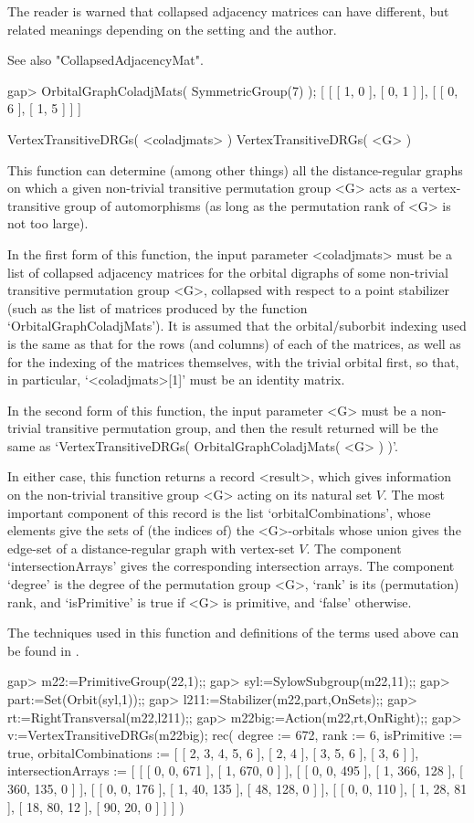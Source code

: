 The reader is warned that collapsed adjacency matrices can have different,
but related meanings depending on the setting and the author.

See also "CollapsedAdjacencyMat".

\beginexample
gap> OrbitalGraphColadjMats( SymmetricGroup(7) );
[ [ [ 1, 0 ], [ 0, 1 ] ], [ [ 0, 6 ], [ 1, 5 ] ] ] 
\endexample


\>VertexTransitiveDRGs( <coladjmats> )
\>VertexTransitiveDRGs( <G> )

This function can determine (among other things) all the distance-regular
graphs on which a given non-trivial transitive permutation group <G>
acts as a vertex-transitive group of automorphisms (as long as the
permutation rank of <G> is not too large).

In the first form of this function, the input parameter <coladjmats> must
be a list of collapsed adjacency matrices for the orbital digraphs of some
non-trivial transitive permutation group <G>, collapsed with respect to a
point stabilizer (such as the list of matrices produced by the function
`OrbitalGraphColadjMats').  It is assumed that the orbital/suborbit
indexing used is the same as that for the rows (and columns) of each of
the matrices, as well as for the indexing of the matrices themselves,
with the trivial orbital first, so that, in particular, `<coladjmats>[1]'
must be an identity matrix.

In the second form of this function, the input parameter <G> must be a
non-trivial transitive permutation group, and then the result returned
will be the same as `VertexTransitiveDRGs( OrbitalGraphColadjMats( <G>
) )'.

In either case, this function returns a record <result>, which gives
information on the non-trivial transitive group <G> acting on its
natural set $V$.  The most important component of this record is the list
`orbitalCombinations', whose elements give the sets of (the indices of)
the <G>-orbitals whose union gives the edge-set of a distance-regular
graph with vertex-set $V$. The component `intersectionArrays' gives
the corresponding intersection arrays. The component `degree' is the
degree of the permutation group <G>, `rank' is its (permutation) rank,
and `isPrimitive' is true if <G> is primitive, and `false' otherwise.

The techniques used in this function and definitions of the terms used
above can be found in \cite{PS97}.

\beginexample
gap> m22:=PrimitiveGroup(22,1);;
gap> syl:=SylowSubgroup(m22,11);;
gap> part:=Set(Orbit(syl,1));;
gap> l211:=Stabilizer(m22,part,OnSets);;
gap> rt:=RightTransversal(m22,l211);;
gap> m22big:=Action(m22,rt,OnRight);;
gap> v:=VertexTransitiveDRGs(m22big);
rec( degree := 672, rank := 6, isPrimitive := true, 
  orbitalCombinations := [ [ 2, 3, 4, 5, 6 ], [ 2, 4 ], [ 3, 5, 6 ], [ 3, 6 ] 
     ], 
  intersectionArrays := [ [ [ 0, 0, 671 ], [ 1, 670, 0 ] ], [ [ 0, 0, 495 ], 
          [ 1, 366, 128 ], [ 360, 135, 0 ] ], 
      [ [ 0, 0, 176 ], [ 1, 40, 135 ], [ 48, 128, 0 ] ], 
      [ [ 0, 0, 110 ], [ 1, 28, 81 ], [ 18, 80, 12 ], [ 90, 20, 0 ] ] ] )
\endexample
